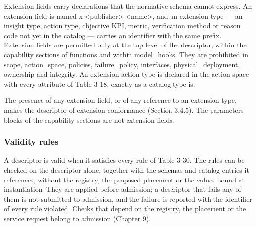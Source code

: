 Extension fields carry declarations that the normative schema cannot
express. An extension field is named
x-\textless publisher\textgreater-\textless name\textgreater, and an
extension type --- an insight type, action type, objective KPI, metric,
verification method or reason code not yet in the catalog --- carries an
identifier with the same prefix. Extension fields are permitted only at
the top level of the descriptor, within the capability sections of
functions and within model\_\allowbreak{}hooks.\allowbreak{} They are
prohibited in scope, action\_\allowbreak{}space, policies,
failure\_\allowbreak{}policy, interfaces,
physical\_\allowbreak{}deployment, ownership and integrity. An extension
action type is declared in the action space with every attribute of
Table 3-18, exactly as a catalog type is.

The presence of any extension field, or of any reference to an extension
type, makes the descriptor of extension conformance (Section 3.4.5). The
parameters blocks of the capability sections are not extension fields.

\hypertarget{validity-rules}{%
\subsubsection{Validity rules}\label{validity-rules}}

A descriptor is valid when it satisfies every rule of Table 3-30. The
rules can be checked on the descriptor alone, together with the schemas
and catalog entries it references, without the registry, the proposed
placement or the values bound at instantiation. They are applied before
admission; a descriptor that fails any of them is not submitted to
admission, and the failure is reported with the identifier of every rule
violated. Checks that depend on the registry, the placement or the
service request belong to admission (Chapter 9).

